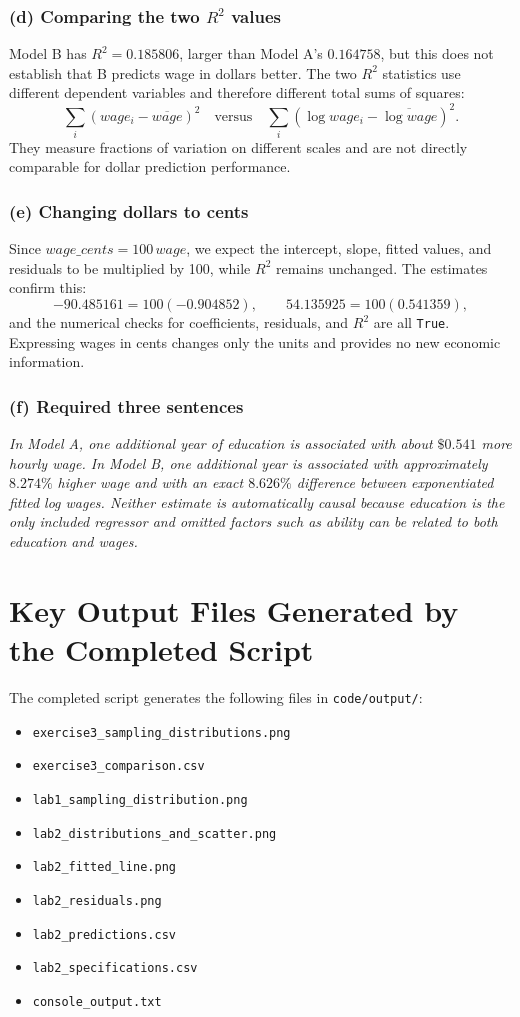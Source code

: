 \documentclass[11pt,a4paper]{article}
\begin{document}
\subsubsection*{(d) Comparing the two $R^2$ values}
Model B has $R^2=0.185806$, larger than Model A's $0.164758$, but this does not establish that B predicts wage in dollars better. The two $R^2$ statistics use different dependent variables and therefore different total sums of squares:
\[
 \sum_i(wage_i-\overline{wage})^2
 \quad\text{versus}\quad
 \sum_i(\log wage_i-\overline{\log wage})^2.
\]
They measure fractions of variation on different scales and are not directly comparable for dollar prediction performance.

\subsubsection*{(e) Changing dollars to cents}
Since $wage\_cents=100\,wage$, we expect the intercept, slope, fitted values, and residuals to be multiplied by 100, while $R^2$ remains unchanged. The estimates confirm this:
\[
 -90.485161=100(-0.904852),
 \qquad
 54.135925=100(0.541359),
\]
and the numerical checks for coefficients, residuals, and $R^2$ are all \texttt{True}. Expressing wages in cents changes only the units and provides no new economic information.

\subsubsection*{(f) Required three sentences}
\emph{In Model A, one additional year of education is associated with about $\$0.541$ more hourly wage. In Model B, one additional year is associated with approximately $8.274\%$ higher wage and with an exact $8.626\%$ difference between exponentiated fitted log wages. Neither estimate is automatically causal because education is the only included regressor and omitted factors such as ability can be related to both education and wages.}

\section{Key Output Files Generated by the Completed Script}
The completed script generates the following files in \texttt{code/output/}:
\begin{itemize}
 \item \texttt{exercise3\_sampling\_distributions.png}
 \item \texttt{exercise3\_comparison.csv}
 \item \texttt{lab1\_sampling\_distribution.png}
 \item \texttt{lab2\_distributions\_and\_scatter.png}
 \item \texttt{lab2\_fitted\_line.png}
 \item \texttt{lab2\_residuals.png}
 \item \texttt{lab2\_predictions.csv}
 \item \texttt{lab2\_specifications.csv}
 \item \texttt{console\_output.txt}
\end{itemize}
\end{document}
